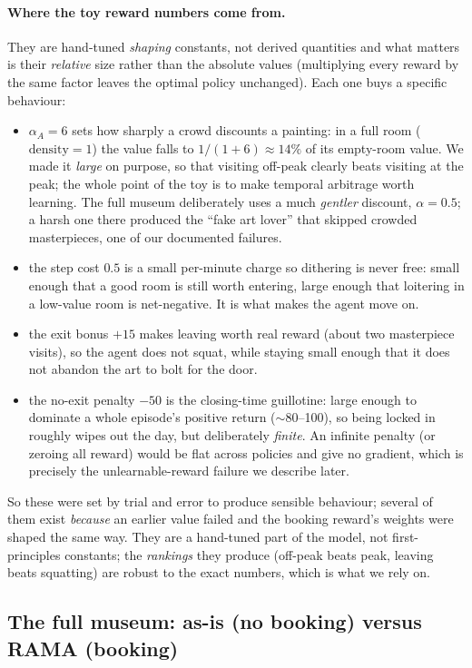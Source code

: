 \documentclass[11pt]{article}
\begin{document}
\paragraph{Where the toy reward numbers come from.} They are hand-tuned \emph{shaping}
constants, not derived quantities and what matters is their \emph{relative} size rather than
the absolute values (multiplying every reward by the same factor leaves the optimal policy
unchanged). Each one buys a specific behaviour:
\begin{itemize}[leftmargin=1.4em,itemsep=2pt]
\item $\alpha_A = 6$ sets how sharply a crowd discounts a painting: in a full room
($\text{density}=1$) the value falls to $1/(1+6)\approx 14\%$ of its empty-room value. We made
it \emph{large} on purpose, so that visiting off-peak clearly beats visiting at the peak; the
whole point of the toy is to make temporal arbitrage worth learning. The full museum
deliberately uses a much \emph{gentler} discount, $\alpha=0.5$; a harsh one there produced the
``fake art lover'' that skipped crowded masterpieces, one of our documented failures.
\item the step cost $0.5$ is a small per-minute charge so dithering is never free: small enough
that a good room is still worth entering, large enough that loitering in a low-value room is
net-negative. It is what makes the agent move on.
\item the exit bonus $+15$ makes leaving worth real reward (about two masterpiece visits), so
the agent does not squat, while staying small enough that it does not abandon the art to bolt
for the door.
\item the no-exit penalty $-50$ is the closing-time guillotine: large enough to dominate a
whole episode's positive return ($\sim$80--100), so being locked in roughly wipes out the day,
but deliberately \emph{finite}. An infinite penalty (or zeroing all reward) would be flat
across policies and give no gradient, which is precisely the unlearnable-reward failure we
describe later.
\end{itemize}
So these were set by trial and error to produce sensible behaviour; several of them exist
\emph{because} an earlier value failed and the booking reward's weights were shaped the same
way. They are a hand-tuned part of the model, not first-principles constants; the
\emph{rankings} they produce (off-peak beats peak, leaving beats squatting) are robust to the
exact numbers, which is what we rely on.

\subsection{The full museum: as-is (no booking) versus RAMA (booking)}
\end{document}
